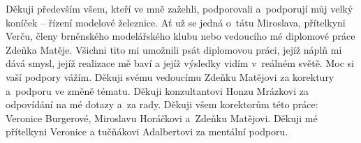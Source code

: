Děkuji především všem, kteří ve mně zažehli, podporovali a~podporují můj velký
koníček – řízení modelové železnice. Ať už se jedná o~tátu
Miroslava, přítelkyni Verču, členy brněnského modelářského klubu nebo vedoucího
mé diplomové práce Zdeňka Matěje. Všichni tito mi umožnili psát diplomovou práci,
jejíž náplň mi dává smysl, jejíž realizace mě baví a jejíž výsledky vidím
v~reálném světě. Moc si vaší podpory vážím.
Děkuji svému vedoucímu Zdeňku Matějovi za korektury a~podporu ve změně tématu.
Děkuji konzultantovi Honzu Mrázkovi za odpovídání na mé dotazy a~za rady.
Děkuji všem korektorům této práce: Veronice Burgerové, Miroslavu Horáčkovi
a~Zdeňku Matějovi.
Děkuji mé přítelkyni Veronice a tučňákovi Adalbertovi za mentální podporu.

